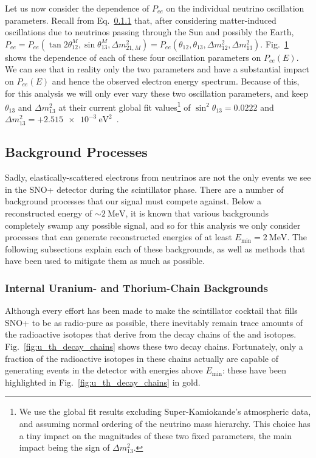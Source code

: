 Let us now consider the dependence of $P_{ee}$ on the individual neutrino oscillation parameters. Recall from Eq.~\ref{} %
that, after considering matter-induced oscillations due to neutrinos passing through the Sun and possibly the Earth, $P_{ee} = P_{ee}\left(\tan2\theta^{M}_{12}, \sin\theta^{M}_{13}, \Delta m^{2}_{21,M}\right) = P_{ee}\left(\theta_{12}, \theta_{13}, \Delta m^{2}_{12}, \Delta m^{2}_{13}\right)$. Fig.~\ref{fig:pee_osc_param_dependence} shows the dependence of each of these four oscillation parameters on $P_{ee}(E)$. We can see that in reality only the two parameters \dmsq{} and \tonetwo{} have a substantial impact on $P_{ee}(E)$ and hence the observed electron energy spectrum. Because of this, for this analysis we will only ever vary these two oscillation parameters, and keep $\theta_{13}$ and $\Delta m^{2}_{13}$ at their current global fit values\footnote{We use the global fit results excluding Super-Kamiokande's atmospheric data, and assuming normal ordering of the neutrino mass hierarchy. This choice has a tiny impact on the magnitudes of these two fixed parameters, the main impact being the sign of $\Delta m^{2}_{13}$.} %
of $\sin^{2}\theta_{13} = 0.0222$ and $\Delta m^{2}_{13} = +\SI{2.515e-3}{\eV\squared}$~\cite{}.%

\begin{figure}
    \centering
    \caption[]{}
    \label{fig:pee_osc_param_dependence}
\end{figure}

\subsection{Background Processes}
Sadly, elastically-scattered electrons from \beight{} neutrinos are not the only events we see in the SNO+ detector during the scintillator phase. There are a number of background processes that our signal must compete against. Below a reconstructed energy of $\sim\SI{2}{\MeV}$, it is known that various backgrounds completely swamp any possible \beight{} signal, and so for this analysis we only consider processes that can generate reconstructed energies of at least $E_{\textrm{min}} = \SI{2}{\MeV}$. The following subsections explain each of these backgrounds, as well as methods that have been used to mitigate them as much as possible.

\subsubsection{Internal Uranium- and Thorium-Chain Backgrounds}
Although every effort has been made to make the scintillator cocktail that fills SNO+ to be as radio-pure as possible, there inevitably remain trace amounts of the radioactive isotopes that derive from the decay chains of the  and  isotopes. Fig.~\ref{fig:u_th_decay_chains} shows these two decay chains. Fortunately, only a fraction of the radioactive isotopes in these chains actually are capable of generating events in the detector with energies above $E_{\textrm{min}}$: these have been highlighted in Fig.~\ref{fig:u_th_decay_chains} in gold.

